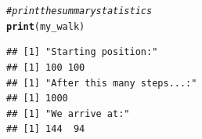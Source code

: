 \documentclass{article}\usepackage[]{graphicx}\usepackage[]{color}
\makeatletter
\newcommand{\hlcom}[1]{\textcolor[rgb]{0.678,0.584,0.686}{\textit{#1}}}%
\newcommand{\hlstd}[1]{\textcolor[rgb]{0.345,0.345,0.345}{#1}}%
\newcommand{\hlkwd}[1]{\textcolor[rgb]{0.737,0.353,0.396}{\textbf{#1}}}%
\newenvironment{kframe}{%
 \def\at@end@of@kframe{}%
 \ifinner\ifhmode%
  \def\at@end@of@kframe{\end{minipage}}%
  \begin{minipage}{\columnwidth}%
 \fi\fi%
 \def\FrameCommand##1{\hskip\@totalleftmargin \hskip-\fboxsep
 \colorbox{shadecolor}{##1}\hskip-\fboxsep
     \hskip-\linewidth \hskip-\@totalleftmargin \hskip\columnwidth}%
 \MakeFramed {\advance\hsize-\width
   \@totalleftmargin\z@ \linewidth\hsize
   \@setminipage}}%
 {\par\unskip\endMakeFramed%
 \at@end@of@kframe}
\newenvironment{knitrout}{}{} %
\makeatother
\begin{document}
\begin{knitrout}
\begin{kframe}\begin{alltt}
\hlcom{# print the summary statistics}
\hlkwd{print}\hlstd{(my_walk)}
\end{alltt}
\begin{verbatim}
## [1] "Starting position:"
## [1] 100 100
## [1] "After this many steps...:"
## [1] 1000
## [1] "We arrive at:"
## [1] 144  94
\end{verbatim}
\end{kframe}
\end{knitrout}
\end{document}
